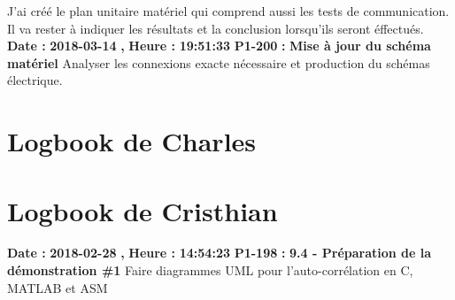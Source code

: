 \documentclass{article}%
\begin{document}
%
J'ai créé le plan unitaire matériel qui comprend aussi les tests de communication. Il va rester à indiquer les résultats et la conclusion lorsqu'ils seront éffectués.\newline%
\newline%
%
\textbf{Date : }%
\textbf{2018{-}03{-}14}%
\textbf{,}%
\textbf{ Heure : }%
\textbf{19:51:33}%
\newline%
%
\textbf{P1{-}200 }%
\textbf{ : }%
\textbf{ Mise à jour du schéma matériel}%
\newline%
\newline%
%
Analyser les connexions exacte nécessaire et production du schémas électrique.\newline%
\newline%
%
\newpage

%
\section{Logbook de Charles}%
\newpage

%
\section{Logbook de Cristhian}%
\textbf{Date : }%
\textbf{2018{-}02{-}28}%
\textbf{,}%
\textbf{ Heure : }%
\textbf{14:54:23}%
\newline%
%
\textbf{P1{-}198 }%
\textbf{ : }%
\textbf{ 9.4 {-} Préparation de la démonstration \#1}%
\newline%
\newline%
%
Faire diagrammes UML pour l'auto{-}corrélation en C, MATLAB et ASM\newline%
\newline%
%
\newpage

%
\end{document}
